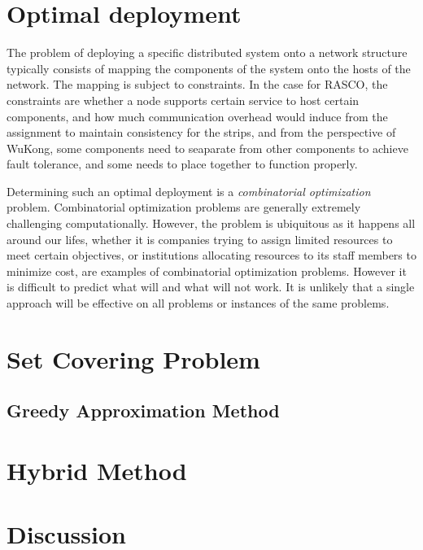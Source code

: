 \section{Optimal deployment}

The problem of deploying a specific distributed system onto a network structure
typically consists of mapping the components of the system onto the hosts of
the network. The mapping is subject to constraints. In the case for RASCO, the
constraints are whether a node supports certain service to host certain
components, and how much communication overhead would induce from the
assignment to maintain consistency for the strips, and from the perspective of
WuKong, some components need to seaparate from other components to achieve
fault tolerance, and some needs to place together to function properly.

Determining such an optimal deployment is a \emph{combinatorial optimization}
problem. Combinatorial optimization problems are generally extremely
challenging computationally. However, the problem is ubiquitous as it happens
all around our lifes, whether it is companies trying to assign limited
resources to meet certain objectives, or institutions allocating resources to
its staff members to minimize cost, are examples of combinatorial optimization
problems. However it is difficult to predict what will and what will not work.
It is unlikely that a single approach will be effective on all problems or
instances of the same problems.

\section{Set Covering Problem}


\subsection{Greedy Approximation Method}

\section{Hybrid Method}

\section{Discussion}
